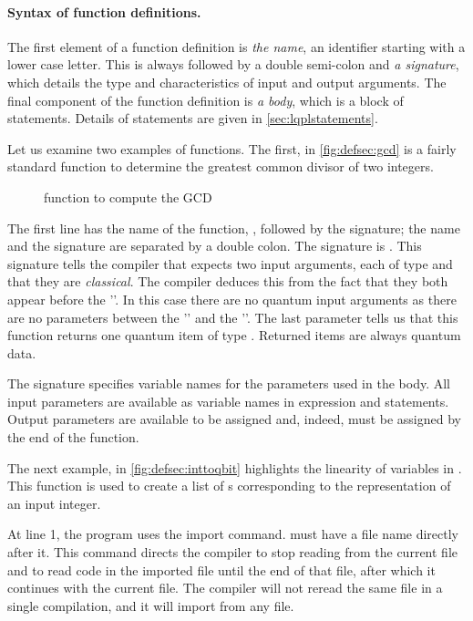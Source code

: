 \paragraph{Syntax of function definitions.} 
The first element of a function definition is
\emph{the name}, an identifier starting with a 
lower case letter. This is always followed by a double semi-colon and 
\emph{a signature}, which details the type and characteristics 
of input and output arguments. The final component of the 
function definition is
\emph{a body}, which is a block of \lqpl{} statements. 
Details of statements are given in \vref{sec:lqplstatements}.

Let us examine two examples of functions. The first, in \vref{fig:defsec:gcd}
 is a fairly 
standard function to determine the greatest common divisor of two 
integers.

\begin{wrapfigure}{l}{2.75in}
\begin{singlespace}

\end{singlespace}
\caption{\lqpl{} function to compute the GCD}\label{fig:defsec:gcd}
\end{wrapfigure}

The first line has  the name of the function, ,
followed by the signature; the name and the signature
are separated by a double colon.
The signature is  .
This signature tells the compiler that  expects
two input arguments, each of type  and that they are
 \emph{classical}. The compiler deduces this
from the fact that they both appear before the '\inlqpl{|}'.
In this case there are no  quantum input arguments
as there are no parameters between the '\inlqpl{|}' and the
'\inlqpl{;}'. The last parameter tells us that this function returns
one quantum item of type . Returned items are always  
quantum data.

The signature specifies variable names for the parameters
 used in the body. All input parameters are available as variable
names in expression and statements. Output parameters are available to be
assigned and, indeed, must be assigned by the end of the function.


The next example, in \vref{fig:defsec:inttoqbit}
 highlights the linearity of variables in \lqpl. This function is 
 used to create a list of \qbit{}s corresponding to the
\bit{} representation of an input integer.

At line 1,  the program uses the import command.
 must have a file name directly after it. This 
command directs the compiler to stop reading from the current file
and to read  code in the imported file until the end of that
file, after which it  continues with the current 
file.  The compiler will not reread the same file in a single
 compilation, and it will import from any file.


